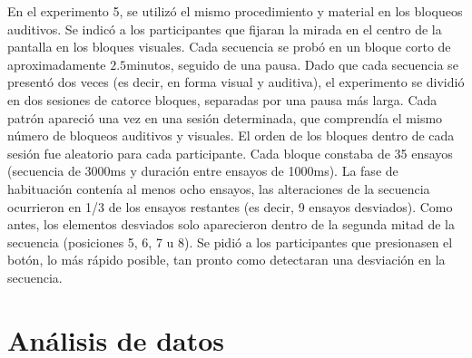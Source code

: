 
En el experimento 5, se utilizó el mismo procedimiento y material en los bloqueos auditivos. Se indicó a los participantes que fijaran la mirada en el centro de la pantalla en los bloques visuales. Cada secuencia se probó en un bloque corto de aproximadamente $2.5$minutos, seguido de una pausa. Dado que cada secuencia se presentó dos veces (es decir, en forma visual y auditiva), el experimento se dividió en dos sesiones de catorce bloques, separadas por una pausa más larga. Cada patrón apareció una vez en una sesión determinada, que comprendía el mismo número de bloqueos auditivos y visuales. El orden de los bloques dentro de cada sesión fue aleatorio para cada participante. Cada bloque constaba de 35 ensayos (secuencia de 3000ms y duración entre ensayos de 1000ms). La fase de habituación contenía al menos ocho ensayos, las alteraciones de la secuencia ocurrieron en 1/3 de los ensayos restantes (es decir, 9 ensayos desviados). Como antes, los elementos desviados solo aparecieron dentro de la segunda mitad de la secuencia (posiciones 5, 6, 7 u 8). Se pidió a los participantes que presionasen el botón, lo más rápido posible, tan pronto como detectaran una desviación en la secuencia.

\section{Análisis de datos}


